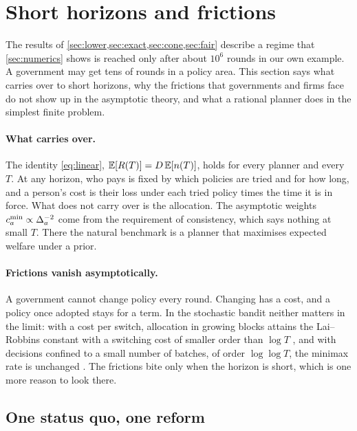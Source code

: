 \section{Short horizons and frictions}\label{sec:finite}

The results of \cref{sec:lower,sec:exact,sec:cone,sec:fair} describe a regime that \cref{sec:numerics} shows is reached only after about $10^6$ rounds in our own example. A government may get tens of rounds in a policy area. This section says what carries over to short horizons, why the frictions that governments and firms face do not show up in the asymptotic theory, and what a rational planner does in the simplest finite problem.

\paragraph{What carries over.} The identity \eqref{eq:linear}, $\mathbb{E}[R(T)]=D\,\mathbb{E}[n(T)]$, holds for every planner and every $T$. At any horizon, who pays is fixed by which policies are tried and for how long, and a person's cost is their loss under each tried policy times the time it is in force. What does not carry over is the allocation. The asymptotic weights $c^{\min}_a\propto\Delta_a^{-2}$ come from the requirement of consistency, which says nothing at small $T$. There the natural benchmark is a planner that maximises expected welfare under a prior.

\paragraph{Frictions vanish asymptotically.} A government cannot change policy every round. Changing has a cost, and a policy once adopted stays for a term. In the stochastic bandit neither matters in the limit: with a cost per switch, allocation in growing blocks attains the Lai--Robbins constant with a switching cost of smaller order than $\log T$ \citep{agrawal1988}, and with decisions confined to a small number of batches, of order $\log\log T$, the minimax rate is unchanged \citep{perchet2016,gao2019}. The frictions bite only when the horizon is short, which is one more reason to look there.

\subsection{One status quo, one reform}

